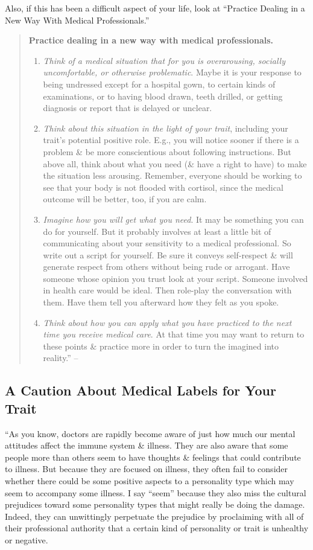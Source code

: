 \documentclass{article}
\numberwithin{equation}{section}
\begin{document}
Also, if this has been a difficult aspect of your life, look at ``Practice Dealing in a New Way With Medical Professionals.''
\begin{quotation}
	\textbf{Practice dealing in a new way with medical professionals.}
	\begin{enumerate}
		\item \textit{Think of a medical situation that for you is overarousing, socially uncomfortable, or otherwise problematic}. Maybe it is your response to being undressed except for a hospital gown, to certain kinds of examinations, or to having blood drawn, teeth drilled, or getting diagnosis or report that is delayed or unclear.
		\item \textit{Think about this situation in the light of your trait}, including your trait's potential positive role. E.g., you will notice sooner if there is a problem \& be more conscientious about following instructions. But above all, think about what you need (\& have a right to have) to make the situation less arousing. Remember, everyone should be working to see that your body is not flooded with cortisol, since the medical outcome will be better, too, if you are calm.
		\item \textit{Imagine how you will get what you need}. It may be something you can do for yourself. But it probably involves at least a little bit of communicating about your sensitivity to a medical professional. So write out a script for yourself. Be sure it conveys self-respect \& will generate respect from others without being rude or arrogant. Have someone whose opinion you trust look at your script. Someone involved in health care would be ideal. Then role-play the conversation with them. Have them tell you afterward how they felt as you spoke.
		\item \textit{Think about how you can apply what you have practiced to the next time you receive medical care}. At that time you may want to return to these points \& practice more in order to turn the imagined into reality.'' -- \cite[pp. 224--225]{Aron2013}
	\end{enumerate}
\end{quotation}

\subsection{A Caution About Medical Labels for Your Trait}
``As you know, doctors are rapidly become aware of just how much our mental attitudes affect the immune system \& illness. They are also aware that some people more than others seem to have thoughts \& feelings that could contribute to illness. But because they are focused on illness, they often fail to consider whether there could be some positive aspects to a personality type which may seem to accompany some illness. I say ``seem'' because they also miss the cultural prejudices toward some personality types that might really be doing the damage. Indeed, they can unwittingly perpetuate the prejudice by proclaiming with all of their professional authority that a certain kind of personality or trait is unhealthy or negative.
\end{document}
